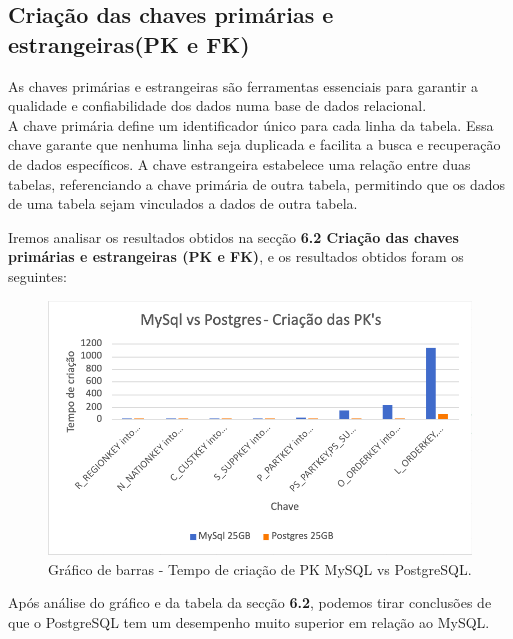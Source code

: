 \documentclass{article}
\begin{document}
\subsection{Criação das chaves primárias e estrangeiras(PK e FK)}

\texttt{}\par As chaves primárias e estrangeiras são ferramentas essenciais para garantir a qualidade e confiabilidade dos dados numa base de dados relacional. \\
A chave primária define um identificador único para cada linha da tabela. Essa chave garante que nenhuma linha seja duplicada e facilita a busca e recuperação de dados específicos. A chave estrangeira estabelece uma relação entre duas tabelas, referenciando a chave primária de outra tabela, permitindo que os dados de uma tabela sejam vinculados a dados de outra tabela.\\

\texttt{}\par Iremos analisar os resultados obtidos na secção \textbf{6.2 Criação das chaves primárias e estrangeiras (PK e FK)}, e os resultados obtidos foram os seguintes:

\begin{figure}[H]
  \centering
  \includegraphics[width=\textwidth]{Graphs/PKCreation.png}
  \caption{Gráfico de barras - Tempo de criação de PK MySQL vs PostgreSQL.}
  \label{fig:PKCreation1}
\end{figure}



\texttt{}\par Após análise do gráfico e da tabela da secção \textbf{6.2}, podemos tirar conclusões de que o PostgreSQL tem um desempenho muito superior em relação ao MySQL. \\
\end{document}
